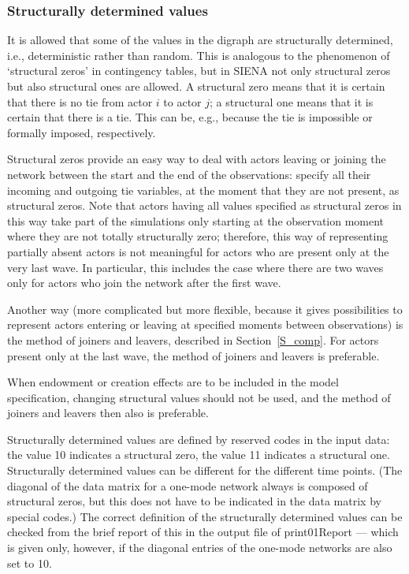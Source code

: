 \documentclass[a4paper,fleqn,11pt]{article}
\newcommand{\+}{\, + \,}
\newcommand{\sfn}[1]{\textsf{#1}}
\newcommand{\SI}{{\sf SIENA }}
\begin{document}
\subsubsection{Structurally determined values}
\label{S_struct}

It is allowed that some of the values in the digraph are
structurally determined, i.e., deterministic rather than random.
This is analogous to the phenomenon of `structural zeros' in
contingency tables, but in \SI not only structural zeros but also
structural ones are allowed. A structural zero means that it is
certain that there is no tie from actor $i$ to actor $j$; a
structural one means that it is certain that there is a tie. This
can be, e.g., because the tie is impossible or formally imposed,
respectively.

Structural zeros provide an easy way to deal with actors leaving
or joining the network between the start and the end
of the observations: specify all their incoming and outgoing tie
variables, at the moment that they are not present, as structural zeros.
Note that actors having all values specified as structural zeros in this way
take part of the simulations only starting at the observation moment
where they are not totally structurally zero;
therefore, this way of representing partially absent actors
is not meaningful for actors who are present only at the very last wave.
In particular, this includes the case where there are two waves only
for actors who join the network after the first wave.

Another way (more complicated but more flexible,
because it gives possibilities to represent actors
entering or leaving at specified moments between observations)
is the method of joiners and leavers, described in Section~\ref{S_comp}.
For actors present only at the last wave, the method of
joiners and leavers is preferable.

When endowment or creation effects are to be included in the
model specification, changing structural values should not be used,
and the method of joiners and leavers then also is preferable.

Structurally determined values are defined by reserved codes in
the input data: the value 10 indicates a structural zero, the
value 11 indicates a structural one. Structurally determined
values can be different for the different time points. (The
diagonal of the data matrix for a one-mode network
always is composed of structural
zeros, but this does not have to be indicated in the data matrix
by special codes.) The correct definition of the structurally
determined values can be checked from the brief report of this in
the output file of \sfn{print01Report} --- which is given only,
however, if the diagonal entries of the one-mode networks are also
set to 10.
\end{document}
